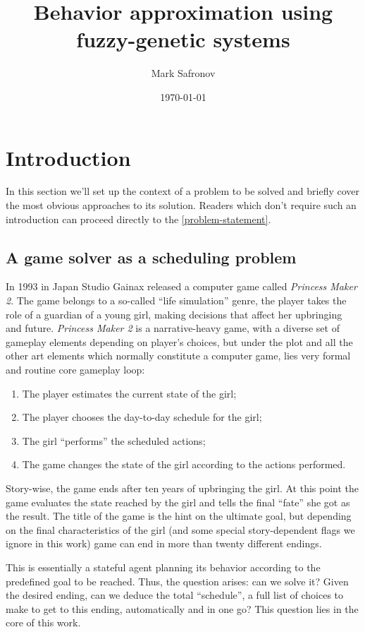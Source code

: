 \documentclass[11pt, a4paper]{article}
\title{Behavior approximation using fuzzy-genetic systems}
\author{Mark Safronov}
\date{\today}
\begin{document}
	
	
	
	\tableofcontents
	
	\section{Introduction}
	
	In this section we'll set up the context of a problem to be solved and briefly cover the most obvious approaches to its solution.
	Readers which don't require such an introduction can proceed directly to the \ref{problem-statement}.
	
	\subsection{A game solver as a scheduling problem}

	In 1993 in Japan Studio Gainax released a computer game called \textit{Princess Maker 2}.
	The game belongs to a so-called ``life simulation'' genre, the player takes the role of a guardian of a young girl, making decisions that affect her upbringing and future.
	\textit{Princess Maker 2} is a narrative-heavy game, with a diverse set of gameplay elements depending on player's choices, but under the plot and all the other art elements which normally constitute a computer game, lies very formal and routine core gameplay loop:
	
	\begin{enumerate}
		\item The player estimates the current state of the girl;
		\item The player chooses the day-to-day schedule for the girl;
		\item The girl ``performs'' the scheduled actions;
		\item The game changes the state of the girl according to the actions performed.
	\end{enumerate}
	
	Story-wise, the game ends after ten years of upbringing the girl.
	At this point the game evaluates the state reached by the girl and tells the final ``fate'' she got as the result.
	The title of the game is the hint on the ultimate goal, but depending on the final characteristics of the girl (and some special story-dependent flags we ignore in this work) game can end in more than twenty different endings.
		
	This is essentially a stateful agent planning its behavior according to the predefined goal to be reached.
	Thus, the question arises: can we solve it? Given the desired ending, can we deduce the total ``schedule'', a full list of choices to make to get to this ending, automatically and in one go? This question lies in the core of this work.
\end{document}
